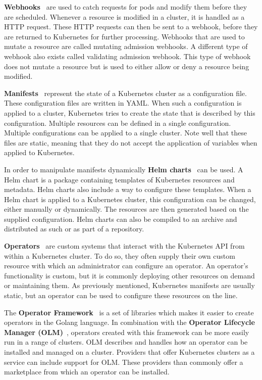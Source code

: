 \textbf{Webhooks}~\cite{kubernetes-webhooks} are used to catch requests for pods and modify them before they are scheduled.
Whenever a resource is modified in a cluster, it is handled as a HTTP request.
These HTTP requests can then be sent to a webhook, before they are returned to Kubernetes for further processing.
Webhooks that are used to mutate a resource are called mutating admission webhooks.
A different type of webhook also exists called validating admission webhook.
This type of webhook does not mutate a resource but is used to either allow or deny a resource being modified.

\textbf{Manifests}~\cite{kubernetes-manifests} represent the state of a Kubernetes cluster as a configuration file.
These configuration files are written in YAML.
When such a configuration is applied to a cluster, Kubernetes tries to create the state that is described by this configuration.
Multiple resources can be defined in a single configuration.
Multiple configurations can be applied to a single cluster.
Note well that these files are static, meaning that they do not accept the application of variables when applied to Kubernetes.

In order to manipulate manifests dynamically \textbf{Helm charts}~\cite{helm-charts} can be used.
A Helm chart is a package containing templates of Kubernetes resources and metadata.
Helm charts also include a way to configure these templates.
When a Helm chart is applied to a Kubernetes cluster, this configuration can be changed, either manually or dynamically.
The resources are then generated based on the supplied configuration.
Helm charts can also be compiled to an archive and distributed as such or as part of a repository.

\pagebreak

\textbf{Operators}~\cite{kubernetes-operator} are custom systems that interact with the Kubernetes API from within a Kubernetes cluster.
To do so, they often supply their own custom resource with which an administrator can configure an operator.
An operator's functionality is custom, but it is commonly deploying other resources on demand or maintaining them.
As previously mentioned, Kubernetes manifests are usually static, but an operator can be used to configure these resources on the line.

The \textbf{Operator Framework}~\cite{operator-framework, operator-lifecycle-manager} is a set of libraries which makes it easier to create operators in the Golang language.
In combination with the \textbf{Operator Lifecycle Manager (OLM)}~\cite{operator-lifecycle-manager}, operators created with this framework can be more easily run in a range of clusters.
OLM describes and handles how an operator can be installed and managed on a cluster.
Providers that offer Kubernetes clusters as a service can include support for OLM.
These providers than commonly offer a marketplace from which an operator can be installed.

